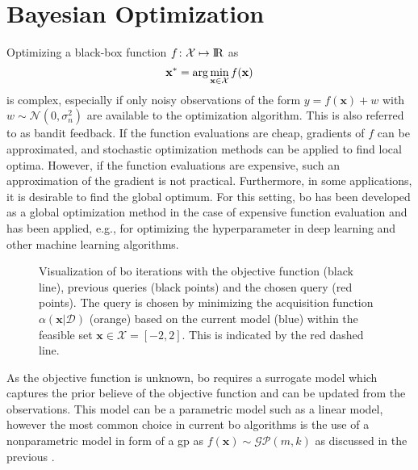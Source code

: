\section{Bayesian Optimization}
\label{sec:bo}

Optimizing a black-box function $f\colon \mathcal{X} \mapsto \mathrm{I\!R}$ as 
\begin{equation}
    \mathbf{x}^* = \arg\min_{\mathbf{x} \in \mathcal{X}} f(\mathbf{x})
    \label{eq:bo_setup}
\end{equation}
is complex, especially if only noisy observations of the form $y = f(\mathbf{x}) + w$ with ${w \sim \mathcal{N}(0, \sigma_n^2)}$ are available to the optimization algorithm. This is also referred to as bandit feedback. If the function evaluations are cheap, gradients of $f$ can be approximated, and stochastic optimization methods can be applied to find local optima. 
However, if the function evaluations are expensive, such an approximation of the gradient is not practical. Furthermore, in some applications, it is desirable to find the global optimum. For this setting, \gls{bo} has been developed as a global optimization method in the case of expensive function evaluation and has been applied, e.g., for optimizing the hyperparameter in deep learning and other machine learning algorithms. 

\begin{figure}[t]
    \centering
    
    \caption[Visualization of \gls{bo} iterations.]{Visualization of \gls{bo} iterations with the objective function (black line), previous queries (black points) and the chosen query (red points). The query is chosen by minimizing the acquisition function $\alpha(\mathbf{x}|\mathcal{D})$ (orange) based on the current model (blue) within the feasible set $\mathbf{x} \in \mathcal{X} = [-2, 2]$. This is indicated by the red dashed line.}
    \label{fig:bo_example}
\end{figure}

As the objective function is unknown, \gls{bo} requires a surrogate model which captures the prior believe of the objective function and can be updated from the observations. This model can be a parametric model such as a linear model, however the most common choice in current \gls{bo} algorithms is the use of a nonparametric model in form of a \gls{gp} as $f(\mathbf{x}) \sim \mathcal{GP}(m, k)$ as discussed in the previous . 

